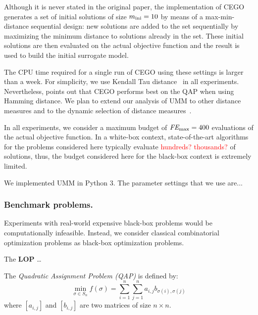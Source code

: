 \documentclass[runningheads]{llncs}
\begin{document}
Although it is never stated in the original paper, the implementation of CEGO
generates a set of initial solutions of size $m_\text{ini}=10$ by means of a
max-min-distance sequential design: new solutions are added to the set
sequentially by maximizing the minimum distance to solutions already in the
set. These initial solutions are then evaluated on the actual objective
function and the result is used to build the initial surrogate
model.%

The CPU time required for a single run of CEGO using these settings is larger
than a week.  For simplicity, we use Kendall Tau distance~\citep{?} in all
experiments. Nevertheless,
\citet{ZaeStoFriFisNauBar2014} points out that CEGO performs best on the QAP
when using Hamming distance. We plan to extend our analysis of UMM to other
distance measures and to the dynamic selection of distance
measures~\citep{ZaeStoBar2014:ppsn}.

In all experiments, we consider a maximum budget of $\textit{FE}_{\max}=400$ evaluations of
the actual objective function. In a white-box context, state-of-the-art
algorithms for the problems considered here typically evaluate
\textcolor{red}{hundreds? thousands?} of solutions, thus, the budget considered
here for the black-box context is extremely limited.

We implemented UMM in Python 3. The parameter settings that we use are...



\subsubsection{Benchmark problems.} Experiments with real-world expensive black-box problems would be computationally infeasible. Instead, we consider classical combinatorial optimization problems as black-box optimization problems.

The \textbf{LOP} \ldots

The \emph{Quadratic Assignment Problem (QAP)} is defined by:
\begin{equation}\label{eq:qap}
  \min_{\sigma \in S_n} f(\sigma) = \sum_{i=1}^n \sum_{j=1}^n a_{i,j} b_{\sigma(i), \sigma(j)}
\end{equation}
%
where $[a_{i,j}]$ and $[b_{i,j}]$ are two matrices of size $n \times n$.
\end{document}
